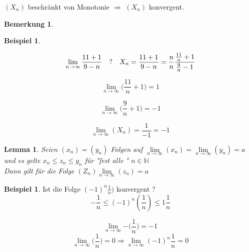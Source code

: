 \documentclass[a4paper,12pt,leqno]{report}
\theoremstyle{plain} %
\newtheorem{lemma}[theorem]{Lemma}
\theoremstyle{definition} %
\newtheorem{remark}[theorem]{Bemerkung}
\newtheorem{example}[theorem]{Beispiel}
\begin{document}
$(X_n)$ beschränkt von Monotonie $\Rightarrow$ $(X_n)$ konvergent.  

\begin{remark}
\end{remark}

\begin{example}

\end{example}
\begin{equation}
\lim\limits_{n \rightarrow \infty}{\frac{11+1}{9-n}}\quad ? \\
\\\quad X_n = \frac{11+1}{9-n}=\frac{n}{n} \frac{\frac{11}{n}+1}{\frac{9}{n}-1}
\end{equation}

\begin{equation}
\lim\limits_{n \rightarrow \infty}{\bigg(\frac{11}{n}+1\bigg)}=1
\end{equation}

\begin{equation}
\lim\limits_{n \rightarrow \infty}{\bigg(\frac{9}{n}+1\bigg)}=-1
\end{equation}

\begin{equation}
\lim\limits_{n \rightarrow \infty}{(X_n)}= \frac{1}{-1}=-1
\end{equation}

\begin{lemma}
Seien $(x_n)=(y_n)$ Folgen auf $\lim\limits_{n \rightarrow \infty}{(x_n)}= \lim\limits_{n \rightarrow \infty}{(y_n)}= a$ und es gelte 
$x_n \leq z_n \leq y_n$ für "fest alle " $n \in \mathbb{N}$\\

Dann gilt für die Folge $(Z_n) \lim\limits_{n \rightarrow \infty}{(z_n)}=a$
\end{lemma}

\begin{example}
Ist die Folge $(-1)^n\frac{1}{n})$ konvergent ?\\

\[ - \frac{1}{n} \leq(-1)^n(\frac{1}{n}) \leq 1 \frac{1}{n}\]
 
\[ \lim\limits_{n \rightarrow \infty}{- \big(\frac{1}{n} \big)}= -1 \]  
\[ \lim\limits_{n \rightarrow \infty}{ \big(\frac{1}{n} \big)}= 0 \Rightarrow \lim\limits_{n \rightarrow \infty}{(-1)^n \frac{1}{n}}= 0                                        
\]
\end{example}
\end{document}

